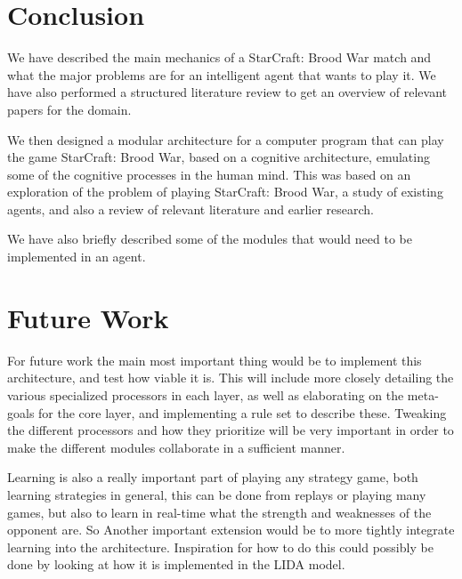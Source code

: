 \section{Conclusion}
We have described the main mechanics of a StarCraft: Brood War match and what
the major problems are for an intelligent agent that wants to play it. We have
also performed a structured literature review to get an overview of relevant
papers for the domain.

We then designed a modular architecture for a computer program that can play the
game StarCraft: Brood War, based on a cognitive architecture, emulating some of
the cognitive processes in the human mind. This was based on an exploration of
the problem of playing StarCraft: Brood War, a study of existing agents, and
also a review of relevant literature and earlier research.

We have also briefly described some of the modules that would need to be
implemented in an agent.

\section{Future Work}
\label{sec:futurework}
For future work the main most important thing would be to implement this
architecture, and test how viable it is. This will include more closely
detailing the various specialized processors in each layer, as well as
elaborating on the meta-goals for the core layer, and implementing a rule set to
describe these. Tweaking the different processors and how they prioritize will
be very important in order to make the different modules collaborate in a
sufficient manner.  

Learning is also a really important part of playing any strategy game, both
learning strategies in general, this can be done from replays or playing many
games, but also to learn in real-time what the strength and weaknesses of the
opponent are. So Another important extension would be to more tightly integrate
learning into the architecture. Inspiration for how to do this could possibly be
done by looking at how it is implemented in the LIDA
model\cite{franklin2007lida}.
